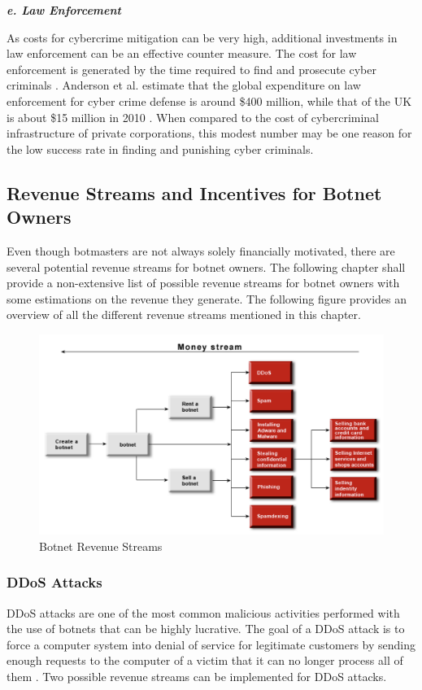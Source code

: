 			\textbf{\textit{e. Law Enforcement}}
			
		As costs for cybercrime mitigation can be very high, additional investments in law enforcement can be an effective counter measure. The cost for law enforcement is generated by the time required to find and prosecute cyber criminals \cite{Anderson13}. Anderson et al. \cite{Anderson13} estimate that the global expenditure on law enforcement for cyber crime defense is around \$400 million, while that of the UK is about \$15 million in 2010 \cite{Anderson13}. When compared to the cost of cybercriminal infrastructure of private corporations, this modest number may be one reason for the low success rate in finding and punishing cyber criminals. 
		
	\subsection{Revenue Streams and Incentives for Botnet Owners}
		Even though botmasters are not always solely financially motivated, there are several potential revenue streams for botnet owners. The following chapter shall provide a non-extensive list of possible revenue streams for botnet owners with some estimations on the revenue they generate. The following figure provides an overview of all the different revenue streams mentioned in this chapter.
		
		
\begin{figure}[ht]
\begin{center}
\includegraphics[scale=0.6]{Talk11/RevenueStreams}
\end{center}
\caption{Botnet Revenue Streams \cite{Namestnikov09}}
\label{label}
\end{figure}
		
		\subsubsection{DDoS Attacks}
		DDoS attacks are one of the most common malicious activities performed with the use of botnets that can be highly lucrative. The goal of a DDoS attack is to force a computer system into denial of service for legitimate customers by sending enough requests to the computer of a victim that it can no longer process all of them \cite{Namestnikov09}. Two possible revenue streams can be implemented for DDoS attacks.

